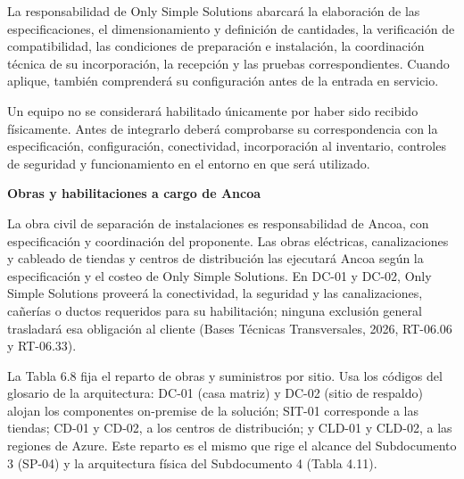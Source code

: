 \documentclass[11pt]{article}
\begin{document}
La responsabilidad de Only Simple Solutions abarcará la elaboración de
las especificaciones, el dimensionamiento y definición de cantidades, la
verificación de compatibilidad, las condiciones de preparación e
instalación, la coordinación técnica de su incorporación, la recepción y
las pruebas correspondientes. Cuando aplique, también comprenderá su
configuración antes de la entrada en servicio.

Un equipo no se considerará habilitado únicamente por haber sido
recibido físicamente. Antes de integrarlo deberá comprobarse su
correspondencia con la especificación, configuración, conectividad,
incorporación al inventario, controles de seguridad y funcionamiento en
el entorno en que será utilizado.

\textbf{Obras y habilitaciones a cargo de Ancoa}

La obra civil de separación de instalaciones es responsabilidad de Ancoa, con especificación y coordinación del proponente. Las obras eléctricas, canalizaciones y cableado de tiendas y centros de distribución las ejecutará Ancoa según la especificación y el costeo de Only Simple Solutions. En DC-01 y DC-02, Only Simple Solutions proveerá la conectividad, la seguridad y las canalizaciones, cañerías o ductos requeridos para su habilitación; ninguna exclusión general trasladará esa obligación al cliente (Bases Técnicas Transversales, 2026, RT-06.06 y RT-06.33).

La Tabla 6.8 fija el reparto de obras y suministros por sitio. Usa los
códigos del glosario de la arquitectura: DC-01 (casa matriz) y DC-02
(sitio de respaldo) alojan los componentes on-premise de la solución;
SIT-01 corresponde a las tiendas; CD-01 y CD-02, a los centros de
distribución; y CLD-01 y CLD-02, a las regiones de Azure. Este reparto es
el mismo que rige el alcance del Subdocumento 3 (SP-04) y la arquitectura
física del Subdocumento 4 (Tabla 4.11).
\end{document}
